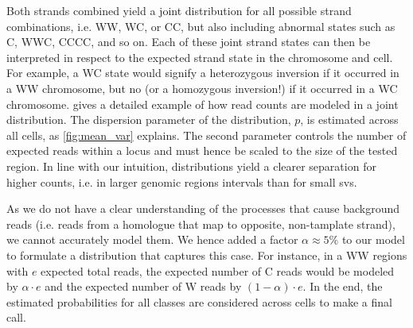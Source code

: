 Both strands combined yield a joint distribution for all possible strand
combinations, i.e. WW, WC, or CC, but also including abnormal states such as C, WWC, CCCC,
and so on. Each of these joint strand states can then be interpreted in respect
to the expected strand state in the chromosome and cell. For example, a WC state would
signify a heterozygous inversion if it occurred in a WW chromosome, but no \sv
(or a homozygous inversion!) if it occurred in a WC chromosome.
 gives a detailed example of how read counts are modeled
in a joint \nb distribution. The dispersion parameter of the \nb distribution,
$p$, is estimated across all cells, as \cref{fig:mean_var} explains. The second
\nb parameter controls the number of expected reads within a locus and must
hence be scaled to the size of the tested region. In line with our intuition,
\nb distributions yield a clearer separation for higher counts, i.e. in larger
genomic regions intervals than for small \acp{sv}.

As we do not have a clear understanding of the processes that cause background
reads (i.e. reads from a homologue that map to opposite, non-tamplate strand),
we cannot accurately model them. We hence added a factor
$\alpha \approx 5\%$ to our model to formulate a \nb distribution that captures
this case. For instance, in a WW regions with $e$ expected total reads, the
expected number of C reads would be modeled by $\alpha \cdot e$ and the expected
number of W reads by $(1-\alpha) \cdot e$. In the end, the
estimated \nb probabilities for all \sv classes are considered across cells to
make a final \sv call.


